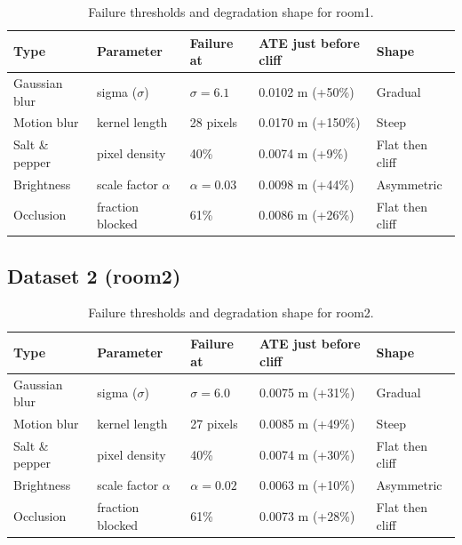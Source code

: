 \documentclass[11pt, a4paper]{article}
\begin{document}
\begin{table}[H]
\centering
\begin{tabular}{lllll}
\toprule
\textbf{Type} & \textbf{Parameter} & \textbf{Failure at} & \textbf{ATE just before cliff} & \textbf{Shape} \\
\midrule
Gaussian blur   & sigma ($\sigma$)      & $\sigma = 6.1$    & 0.0102 m (+50\%)  & Gradual \\
Motion blur     & kernel length         & 28 pixels         & 0.0170 m (+150\%) & Steep \\
Salt \& pepper  & pixel density         & 40\%              & 0.0074 m (+9\%)   & Flat then cliff \\
Brightness      & scale factor $\alpha$ & $\alpha = 0.03$   & 0.0098 m (+44\%)  & Asymmetric \\
Occlusion       & fraction blocked      & 61\%              & 0.0086 m (+26\%)  & Flat then cliff \\
\bottomrule
\end{tabular}
\caption{Failure thresholds and degradation shape for room1.}
\end{table}

\subsection{Dataset 2 (room2)}

\begin{table}[H]
\centering
\begin{tabular}{lllll}
\toprule
\textbf{Type} & \textbf{Parameter} & \textbf{Failure at} & \textbf{ATE just before cliff} & \textbf{Shape} \\
\midrule
Gaussian blur   & sigma ($\sigma$)      & $\sigma = 6.0$    & 0.0075 m (+31\%)  & Gradual \\
Motion blur     & kernel length         & 27 pixels         & 0.0085 m (+49\%)  & Steep \\
Salt \& pepper  & pixel density         & 40\%              & 0.0074 m (+30\%)  & Flat then cliff \\
Brightness      & scale factor $\alpha$ & $\alpha = 0.02$   & 0.0063 m (+10\%)  & Asymmetric \\
Occlusion       & fraction blocked      & 61\%              & 0.0073 m (+28\%)  & Flat then cliff \\
\bottomrule
\end{tabular}
\caption{Failure thresholds and degradation shape for room2.}
\end{table}
\end{document}
